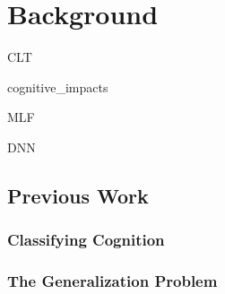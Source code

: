 \chapter{Background}

{CLT}

{cognitive_impacts}


{MLF}

{DNN}

\section{Previous Work}
\subsection{Classifying Cognition}
\subsection{The Generalization Problem}